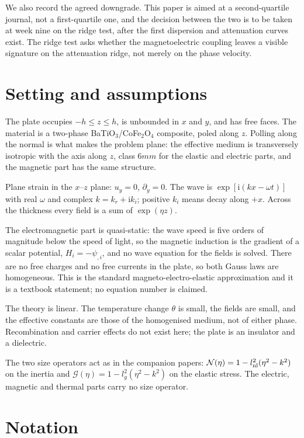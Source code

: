 \documentclass[11pt,a4paper]{article}
\newcommand{\Nc}{\mathcal{N}}
\newcommand{\Gc}{\mathcal{G}}
\newcommand{\ii}{\mathrm{i}}
\begin{document}
We also record the agreed downgrade. This paper is aimed at a second-quartile journal, not a first-quartile
one, and the decision between the two is to be taken at week nine on the ridge test, after the first
dispersion and attenuation curves exist. The ridge test asks whether the magnetoelectric coupling leaves a
visible signature on the attenuation ridge, not merely on the phase velocity.

\section{Setting and assumptions}

The plate occupies $-h\le z\le h$, is unbounded in $x$ and $y$, and has free faces. The material is a
two-phase BaTiO$_3$/CoFe$_2$O$_4$ composite, poled along $z$. Polling along the normal is what makes the
problem plane: the effective medium is transversely isotropic with the axis along $z$, class $6mm$ for the
elastic and electric parts, and the magnetic part has the same structure.

Plane strain in the $x$--$z$ plane: $u_y=0$, $\partial_y=0$. The wave is $\exp[\ii(kx-\omega t)]$ with real
$\omega$ and complex $k=k_r+\ii k_i$; positive $k_i$ means decay along $+x$. Across the thickness every
field is a sum of $\exp(\eta z)$.

The electromagnetic part is quasi-static: the wave speed is five orders of magnitude below the speed of
light, so the magnetic induction is the gradient of a scalar potential, $H_i=-\psi_{,i}$, and no wave
equation for the fields is solved. There are no free charges and no free currents in the plate, so both
Gauss laws are homogeneous. This is the standard magneto-electro-elastic approximation and it is a textbook
statement; no equation number is claimed.

The theory is linear. The temperature change $\theta$ is small, the fields are small, and the effective
constants are those of the homogenised medium, not of either phase. Recombination and carrier effects do not
exist here; the plate is an insulator and a dielectric.

The two size operators act as in the companion papers:
$\Nc(\eta)=1-l_{\rm nl}^2(\eta^2-k^2)$ on the inertia and $\Gc(\eta)=1-l_g^2(\eta^2-k^2)$ on the elastic
stress. The electric, magnetic and thermal parts carry no size operator.

\section{Notation}\label{sec:not}
\end{document}
